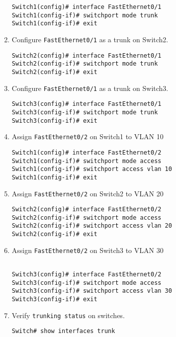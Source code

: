 \documentclass[a4paper]{book}
\begin{document}
\begin{enumerate}
\begin{lstlisting}
Switch1(config)# interface FastEthernet0/1
Switch1(config-if)# switchport mode trunk
Switch1(config-if)# exit
\end{lstlisting}

\item{Configure \texttt{FastEthernet0/1} as a trunk on Switch2.}
\begin{lstlisting}
Switch2(config)# interface FastEthernet0/1
Switch2(config-if)# switchport mode trunk
Switch2(config-if)# exit
\end{lstlisting}

\item{Configure \texttt{FastEthernet0/1} as a trunk on Switch3.}
\begin{lstlisting}
Switch3(config)# interface FastEthernet0/1
Switch3(config-if)# switchport mode trunk
Switch3(config-if)# exit
\end{lstlisting}

\item{Assign \texttt{FastEthernet0/2} on Switch1 to VLAN 10}

\begin{lstlisting}
Switch1(config)# interface FastEthernet0/2
Switch1(config-if)# switchport mode access
Switch1(config-if)# switchport access vlan 10
Switch1(config-if)# exit
\end{lstlisting}

\item{Assign \texttt{FastEthernet0/2} on Switch2 to VLAN 20}

\begin{lstlisting}
Switch2(config)# interface FastEthernet0/2
Switch2(config-if)# switchport mode access
Switch2(config-if)# switchport access vlan 20
Switch2(config-if)# exit
\end{lstlisting}

\item{Assign \texttt{FastEthernet0/2} on Switch3 to VLAN 30}
\begin{lstlisting}

Switch3(config)# interface FastEthernet0/2
Switch3(config-if)# switchport mode access
Switch3(config-if)# switchport access vlan 30
Switch3(config-if)# exit
\end{lstlisting}


\item{Verify \texttt{trunking status} on switches.}

\begin{lstlisting}
Switch# show interfaces trunk
\end{lstlisting}


\end{enumerate}
\end{document}
